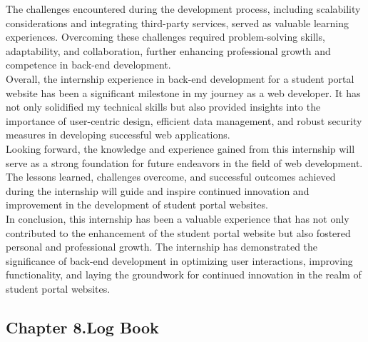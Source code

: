 \documentclass[12pt]{article}
\begin{document}
\hspace{1cm}The challenges encountered during the development process, including scalability considerations and integrating third-party services, served as valuable learning experiences. Overcoming these challenges required problem-solving skills, adaptability, and collaboration, further enhancing professional growth and competence in back-end development.\\

\hspace{1cm}Overall, the internship experience in back-end development for a student portal website has been a significant milestone in my journey as a web developer. It has not only solidified my technical skills but also provided insights into the importance of user-centric design, efficient data management, and robust security measures in developing successful web applications.
\\
\hspace{1cm}Looking forward, the knowledge and experience gained from this internship will serve as a strong foundation for future endeavors in the field of web development. The lessons learned, challenges overcome, and successful outcomes achieved during the internship will guide and inspire continued innovation and improvement in the development of student portal websites.
\\
\hspace{1cm}In conclusion, this internship has been a valuable experience that has not only contributed to the enhancement of the student portal website but also fostered personal and professional growth. The internship has demonstrated the significance of back-end development in optimizing user interactions, improving functionality, and laying the groundwork for continued innovation in the realm of student portal websites.

\pagebreak \newpage
\begin{center}\section*{\Large {Chapter 8.Log Book}}\end{center}
\end{document}
